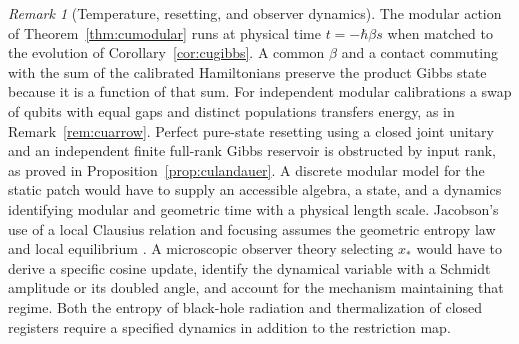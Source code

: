 \documentclass[aps,pra,onecolumn,superscriptaddress,nofootinbib,10pt]{revtex4-2}
\theoremstyle{definition}
\theoremstyle{remark}
\newtheorem{remark}[theorem]{Remark}
\begin{document}
\begin{remark}[Temperature, resetting, and observer dynamics]\label{ob:thermalprogramme}
The modular action of Theorem~\ref{thm:cumodular} runs at physical
time \(t=-\hbar\beta s\) when matched to the evolution of
Corollary~\ref{cor:cugibbs}. A common \(\beta\) and a contact commuting
with the sum of the calibrated Hamiltonians preserve the product
Gibbs state because it is a function of that sum. For independent
modular calibrations a swap of qubits with equal gaps and distinct
populations transfers energy, as in Remark~\ref{rem:cuarrow}.
Perfect pure-state resetting using a closed joint unitary and
an independent finite full-rank Gibbs reservoir is obstructed
by input rank, as proved in Proposition~\ref{prop:culandauer}.
A discrete modular model for the static patch would have to
supply an accessible algebra, a state, and a dynamics identifying
modular and geometric time with a physical length scale.
Jacobson's use of a local Clausius relation and focusing assumes
the geometric entropy law and local equilibrium
\cite{n1-jacobson}. A microscopic observer theory selecting
\(x_*\) would have to derive a specific cosine update, identify
the dynamical variable with a Schmidt amplitude or its doubled
angle, and account for the mechanism maintaining that regime.
Both the entropy of black-hole radiation and thermalization of
closed registers require a specified dynamics in addition to the
restriction map.
\end{remark}
\end{document}
